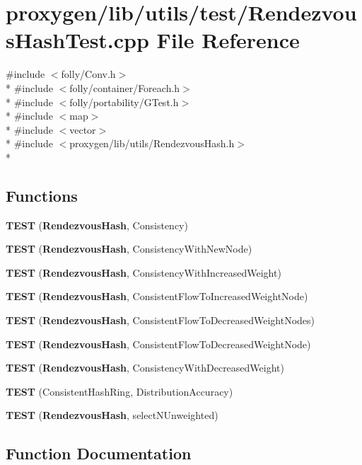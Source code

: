 \section{proxygen/lib/utils/test/\+Rendezvous\+Hash\+Test.cpp File Reference}
\label{RendezvousHashTest_8cpp}
{\ttfamily \#include $<$folly/\+Conv.\+h$>$}\\*
{\ttfamily \#include $<$folly/container/\+Foreach.\+h$>$}\\*
{\ttfamily \#include $<$folly/portability/\+G\+Test.\+h$>$}\\*
{\ttfamily \#include $<$map$>$}\\*
{\ttfamily \#include $<$vector$>$}\\*
{\ttfamily \#include $<$proxygen/lib/utils/\+Rendezvous\+Hash.\+h$>$}\\*
\subsection*{Functions}
\begin{DoxyCompactItemize}
\item 
{\bf T\+E\+ST} ({\bf Rendezvous\+Hash}, Consistency)
\item 
{\bf T\+E\+ST} ({\bf Rendezvous\+Hash}, Consistency\+With\+New\+Node)
\item 
{\bf T\+E\+ST} ({\bf Rendezvous\+Hash}, Consistency\+With\+Increased\+Weight)
\item 
{\bf T\+E\+ST} ({\bf Rendezvous\+Hash}, Consistent\+Flow\+To\+Increased\+Weight\+Node)
\item 
{\bf T\+E\+ST} ({\bf Rendezvous\+Hash}, Consistent\+Flow\+To\+Decreased\+Weight\+Nodes)
\item 
{\bf T\+E\+ST} ({\bf Rendezvous\+Hash}, Consistent\+Flow\+To\+Decreased\+Weight\+Node)
\item 
{\bf T\+E\+ST} ({\bf Rendezvous\+Hash}, Consistency\+With\+Decreased\+Weight)
\item 
{\bf T\+E\+ST} (Consistent\+Hash\+Ring, Distribution\+Accuracy)
\item 
{\bf T\+E\+ST} ({\bf Rendezvous\+Hash}, select\+N\+Unweighted)
\end{DoxyCompactItemize}


\subsection{Function Documentation}
